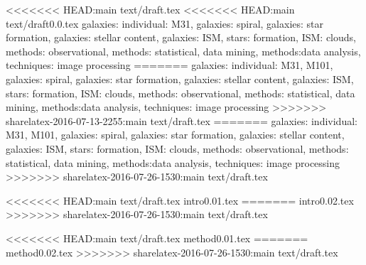 \documentclass[useAMS,usenatbib]{mn2e}
\begin{document}
\begin{keywords} %
<<<<<<< HEAD:main text/draft.tex
<<<<<<< HEAD:main text/draft0.0.tex
galaxies: individual: M31, galaxies: spiral, galaxies: star formation, galaxies: stellar content, galaxies: ISM, stars: formation, ISM: clouds, methods: observational, methods: statistical, data mining, methods:data analysis, techniques: image processing 
=======
galaxies: individual: M31, M101, galaxies: spiral, galaxies: star formation, galaxies: stellar content, galaxies: ISM, stars: formation, ISM: clouds, methods: observational, methods: statistical, data mining, methods:data analysis, techniques: image processing 
>>>>>>> sharelatex-2016-07-13-2255:main text/draft.tex
=======
galaxies: individual: M31, M101, galaxies: spiral, galaxies: star formation, galaxies: stellar content, galaxies: ISM, stars: formation, ISM: clouds, methods: observational, methods: statistical, data mining, methods:data analysis, techniques: image processing 
>>>>>>> sharelatex-2016-07-26-1530:main text/draft.tex
\end{keywords}
<<<<<<< HEAD:main text/draft.tex
{intro0.01.tex}
=======
{intro0.02.tex}
>>>>>>> sharelatex-2016-07-26-1530:main text/draft.tex


<<<<<<< HEAD:main text/draft.tex
{method0.01.tex}
=======
{method0.02.tex}
>>>>>>> sharelatex-2016-07-26-1530:main text/draft.tex
\end{document}
